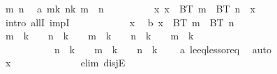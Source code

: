 \begin{isabellebody}
\ m\ n\ \isamarkupfalse%
\ a{\isacharcolon}{\kern0pt}\ {\isachardoublequoteopen}m{\isasymin}{\isacharbraceleft}{\kern0pt}{\isachardot}{\kern0pt}{\isachardot}{\kern0pt}k{\isacharplus}{\kern0pt}{}{\isacharbraceright}{\kern0pt}{\isachardoublequoteclose}\ {\isachardoublequoteopen}n{\isasymin}{\isacharbraceleft}{\kern0pt}{\isachardot}{\kern0pt}{\isachardot}{\kern0pt}k{\isacharplus}{\kern0pt}{}{\isacharbraceright}{\kern0pt}{\isachardoublequoteclose}\ {\isachardoublequoteopen}m\ {\isasymnoteq}\ n{\isachardoublequoteclose}\isanewline
\ \ \ \ \ \ \ \ \isamarkupfalse%
\ {\isachardoublequoteopen}{\isasymforall}x{\isachardot}{\kern0pt}\ x\ {\isasymin}\ BT\ m\ {\isasyminter}\ BT\ n\ {\isasymlongrightarrow}\ x\ {\isasymin}\ {\isacharbraceleft}{\kern0pt}{\isacharbraceright}{\kern0pt}{\isachardoublequoteclose}\ \isanewline
\ \ \ \ \ \ \ \ \isamarkupfalse%
\ {\isacharparenleft}{\kern0pt}intro\ allI\ impI{\isacharparenright}{\kern0pt}\isanewline
\ \ \ \ \ \ \ \ \ \ \isamarkupfalse%
\ x\ \isamarkupfalse%
\ b{\isacharcolon}{\kern0pt}\ {\isachardoublequoteopen}x\ {\isasymin}\ BT\ m\ {\isasyminter}\ BT\ n{\isachardoublequoteclose}\isanewline
\ \ \ \ \ \ \ \ \ \ \isamarkupfalse%
\ {\isachardoublequoteopen}m\ {\isacharless}{\kern0pt}\ k\ {\isacharplus}{\kern0pt}\ {}\ {\isasymand}\ n\ {\isacharless}{\kern0pt}\ k\ {\isacharplus}{\kern0pt}\ {}\ {\isasymor}\ m\ {\isacharequal}{\kern0pt}\ k\ {\isacharplus}{\kern0pt}\ {}\ {\isasymand}\ n\ {\isacharequal}{\kern0pt}\ k\ {\isacharplus}{\kern0pt}\ {}\ {\isasymor}\ m\ {\isacharless}{\kern0pt}\ k\ {\isacharplus}{\kern0pt}\ {}\ \isanewline
\ \ \ \ \ \ \ \ \ \ {\isasymand}\ n\ {\isacharequal}{\kern0pt}\ k\ {\isacharplus}{\kern0pt}\ {}\ {\isasymor}\ m\ {\isacharequal}{\kern0pt}\ k\ {\isacharplus}{\kern0pt}\ {}\ {\isasymand}\ n\ {\isacharless}{\kern0pt}\ k\ {\isacharplus}{\kern0pt}\ {}{\isachardoublequoteclose}\ \isamarkupfalse%
\ a\ le{\isacharunderscore}{\kern0pt}eq{\isacharunderscore}{\kern0pt}less{\isacharunderscore}{\kern0pt}or{\isacharunderscore}{\kern0pt}eq\ \isamarkupfalse%
\ auto\isanewline
\ \ \ \ \ \ \ \ \ \ \isamarkupfalse%
\ \isamarkupfalse%
\ {\isachardoublequoteopen}x\ {\isasymin}\ {\isacharbraceleft}{\kern0pt}{\isacharbraceright}{\kern0pt}{\isachardoublequoteclose}\isanewline
\ \ \ \ \ \ \ \ \ \ \isamarkupfalse%
\ {\isacharparenleft}{\kern0pt}elim\ disjE{\isacharparenright}{\kern0pt}\isanewline

\end{isabellebody}

